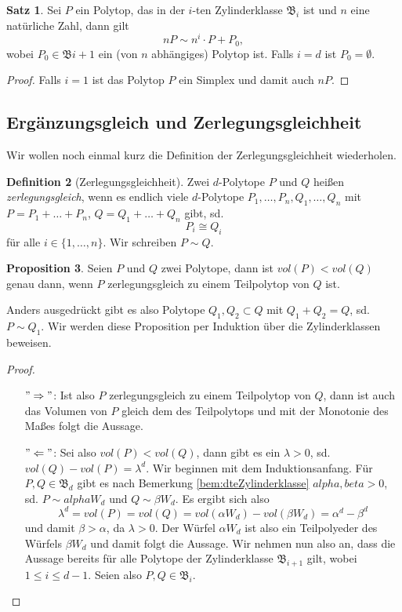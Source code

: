 \documentclass[11pt,titlepage]{article}
\theoremstyle{definition}
\newtheorem{theorem}{Satz}[section]
\newtheorem{proposition}[theorem]{Proposition}
\newtheorem{definition}[theorem]{Definition}
\theoremstyle{remark}
\begin{document}
	\begin{theorem}
		Sei $P$ ein Polytop, das in der $i$-ten Zylinderklasse $\mathfrak{B}_i$ ist 
		und $n$ eine natürliche Zahl, dann gilt
		\[nP\sim n^i\cdot P+P_0,\]
		wobei $P_0\in\mathfrak{B}{i+1}$ ein (von $n$ abhängiges) Polytop ist. 
		Falls $i=d$ ist $P_0=\emptyset$.
	\end{theorem}
	
	\begin{proof}
		Falls $i=1$ ist das Polytop $P$ ein Simplex und damit auch $nP$.
	\end{proof}
	
	\subsection{Ergänzungsgleich und Zerlegungsgleichheit}
	
	Wir wollen noch einmal kurz die Definition der Zerlegungsgleichheit wiederholen.
	
	\begin{definition}[Zerlegungsgleichheit]
		Zwei $d$-Polytope $P$ und $Q$ heißen \textsl{zerlegungsgleich}, wenn es endlich viele $d$-Polytope 
		$P_1,\ldots,P_n,Q_1,\ldots,Q_n$ mit $P=P_1 +\ldots +P_n$,  $Q=Q_1 +\ldots+Q_n$ 
		gibt, sd. 
		\[P_i\cong Q_i\]
		für alle $i\in\{1,\ldots,n\}$. Wir schreiben $P\sim Q$.
	\end{definition}

	\begin{proposition}
		Seien $P$ und $Q$ zwei Polytope, dann ist $vol(P)<vol(Q)$ genau dann, wenn $P$ zerlegungsgleich zu 
		einem Teilpolytop von $Q$ ist.
	\end{proposition}
	
	Anders ausgedrückt gibt es also Polytope $Q_1,Q_2\subset Q$ 
	mit $Q_1+Q_2=Q$, sd. $P\sim Q_1$. Wir werden diese Proposition per 
	Induktion über die Zylinderklassen beweisen.

	\begin{proof}
		\noindent
		\begin{itemize}
			\item[$"\Rightarrow"$:] Ist also $P$ zerlegungsgleich zu einem 
			Teilpolytop von $Q$, dann ist auch das Volumen von $P$ gleich 
			dem des Teilpolytops und mit der Monotonie des Maßes folgt die 
			Aussage.
			\item[$"\Leftarrow"$:] Sei also $vol(P)<vol(Q)$, dann gibt es ein 
			$\lambda>0$, sd. $vol(Q)-vol(P)=\lambda^d$. Wir beginnen 
			mit dem Induktionsanfang. Für $P,Q\in\mathfrak{B}_d$ gibt es 
			nach Bemerkung \ref{bem:dteZylinderklasse} $alpha,beta>0$, sd. 
			$P\sim alpha W_d$ und $Q\sim \beta W_d$. Es ergibt sich also 
			\[\lambda^d =vol(P)=vol(Q)=vol(\alpha W_d)-vol(\beta W_d)=\alpha^d -\beta^d\]
			und damit $\beta >\alpha$, da $\lambda>0$. Der Würfel $\alpha W_d$ 
			ist also ein Teilpolyeder des Würfels $\beta W_d$ und damit 
			folgt die Aussage. Wir nehmen nun also an, dass die Aussage 
			bereits für alle Polytope der Zylinderklasse $\mathfrak{B}_{i+1}$ 
			gilt, wobei $1\leq i\leq d-1$. Seien also $P,Q\in\mathfrak{B}_i$.
		\end{itemize}
	\end{proof}
	
\end{document}
